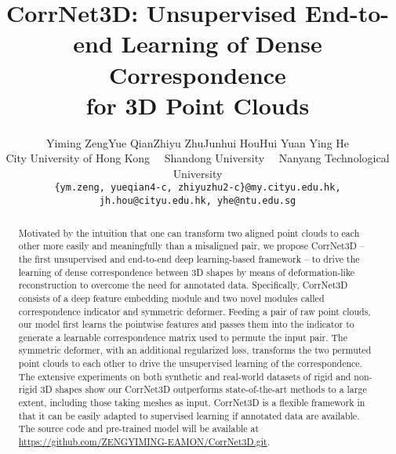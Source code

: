 \documentclass[final]{cvpr}
\begin{document}
\title{CorrNet3D: Unsupervised End-to-end Learning of Dense Correspondence \\for 3D Point Clouds}

\author{ 
\and

Yiming Zeng\quad Yue Qian\quad Zhiyu Zhu\quad Junhui Hou\quad Hui Yuan \quad Ying He\\
City University of Hong Kong~~ Shandong University~~ Nanyang Technological University\\
{\tt\small \{ym.zeng, yueqian4-c, zhiyuzhu2-c\}@my.cityu.edu.hk, jh.hou@cityu.edu.hk,  yhe@ntu.edu.sg}
}

\maketitle
{}








\begin{abstract}
Motivated by the intuition
that one can transform two aligned point clouds to each other more easily and meaningfully than a misaligned
pair, we propose CorrNet3D -- the first unsupervised and end-to-end deep learning-based framework -- to drive the learning of dense correspondence between 3D shapes by means of deformation-like reconstruction to overcome the need for annotated data.
Specifically, CorrNet3D consists of a deep feature embedding module and two novel modules called correspondence indicator and symmetric deformer. Feeding a pair of raw point clouds, our model first learns the pointwise features and passes them into the indicator to generate a learnable correspondence matrix used to permute the input pair. The symmetric deformer, with an additional regularized loss, transforms the two permuted point clouds to each other to drive the unsupervised learning of the correspondence. The extensive experiments on both synthetic and real-world datasets of rigid and non-rigid 3D shapes show our CorrNet3D outperforms state-of-the-art methods to a large extent, including those taking meshes as input. 
CorrNet3D is a flexible framework in that it can be easily adapted to supervised learning if annotated data are available. The source code and pre-trained model will be available at \href{https://github.com/ZENGYIMING-EAMON/CorrNet3D.git}{https://github.com/ZENGYIMING-EAMON/CorrNet3D.git}.
\end{abstract}
\end{document}
